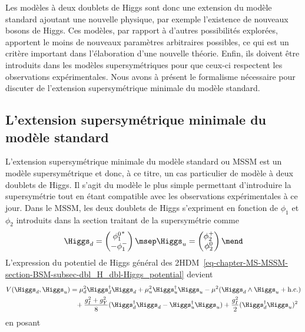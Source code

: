 \par Les modèles à deux doublets de Higgs sont donc une extension du modèle standard ajoutant une nouvelle physique, par exemple l'existence de nouveaux bosons de Higgs.
Ces modèles, par rapport à d'autres possibilités explorées, apportent le moins de nouveaux paramètres arbitraires possibles, ce qui est un critère important dans l'élaboration d'une nouvelle théorie.
Enfin, ils doivent être introduits dans les modèles supersymétriques pour que ceux-ci respectent les observations expérimentales.
Nous avons à présent le formalisme nécessaire pour discuter de l'extension supersymétrique minimale du modèle standard.
\subsection{L'extension supersymétrique minimale du modèle standard}\label{chapter-MS-MSSM-section-BSM-subsec-MSSM}
L'extension supersymétrique minimale du modèle standard ou MSSM
est un modèle supersymétrique et donc, à ce titre, un cas particulier de modèle à deux doublets de Higgs.
Il s'agit du modèle le plus simple permettant d'introduire la supersymétrie tout en étant compatible avec les observations expérimentales à ce jour.
Dans le MSSM, les deux doublets de Higgs s'expriment en fonction de $\phi_1$ et $\phi_2$ introduits dans la section traitant de la supersymétrie comme~\cite{Higgs_hunter_guide}
\begin{equation}
\Higgs_d
=
\begin{pmatrix}
{\phi_1^0}^* \\ -\phi_1^-
\end{pmatrix}
\msep
\Higgs_u
=
\begin{pmatrix}
\phi_2^+ \\ \phi_2^0
\end{pmatrix}
\mend
\label{eq-chapter-MS-MSSM-section-BSM-Higgs_doublets}
\end{equation}
L'expression du potentiel de Higgs général des 2HDM~\eqref{eq-chapter-MS-MSSM-section-BSM-subsec-dbl_H_dbl-Higgs_potential} devient
\begin{align}
V(\Higgs_d,\Higgs_u)
&
=
\mu_d^2\Higgs_d^\dagger\Higgs_d
+
\mu_u^2\Higgs_u^\dagger\Higgs_u
-
\mu^2 (\Higgs_d\wedge\Higgs_u+\text{h.c.})
\nonumber\\
&\hphantom{=}
+
\frac{g_I^2+g_Y^2}{8} (\Higgs_d^\dagger\Higgs_d-\Higgs_u^\dagger\Higgs_u)
+
\frac{g_I^2}{2} (\Higgs_d^\dagger\Higgs_u)^2
\end{align}
en posant
\vspace{-.5\baselineskip}\par\noindent
